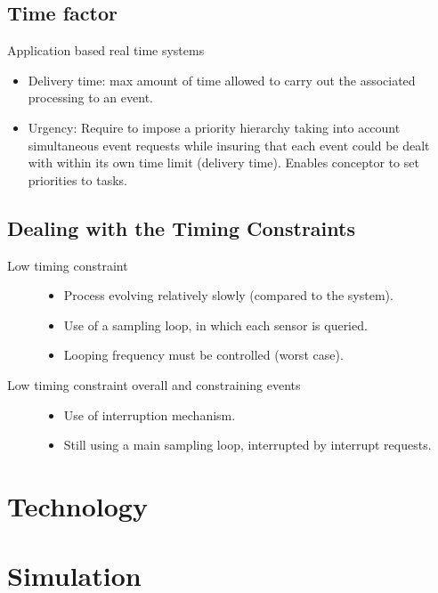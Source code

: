 \documentclass[10pt]{article}
\theoremstyle{plain}
\theoremstyle{definition}
\theoremstyle{remark}
\begin{document}
\subsection{Time factor}
Application based real time systems 
\begin{itemize}
    \item Delivery time: max amount of time allowed to carry out the associated
        processing to an event.
    \item Urgency: Require to impose a priority hierarchy taking into account
        simultaneous event requests while insuring that each event could be
        dealt with within its own time limit (delivery time). Enables conceptor
        to set priorities to tasks.
\end{itemize}

\subsection{Dealing with the Timing Constraints}
\begin{description}
    \item [Low timing constraint]
        \begin{itemize}
            \item Process evolving relatively slowly (compared to the system).
            \item Use of a sampling loop, in which  each sensor is queried.
            \item Looping frequency must be controlled (worst case).
        \end{itemize}
    \item[Low timing constraint overall and  constraining events]
        \begin{itemize}
            \item Use of interruption mechanism.
            \item Still using a main sampling loop, interrupted by interrupt
                requests.
        \end{itemize}
\end{description}


\section{Technology}

\section{Simulation}
\end{document}
